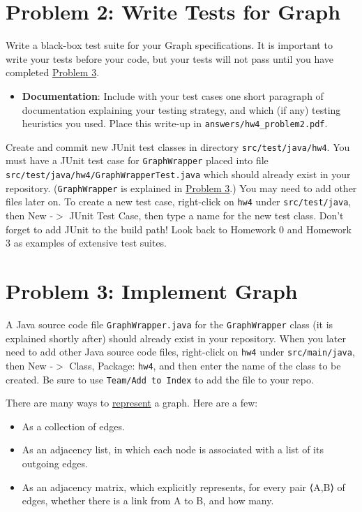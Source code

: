 \documentclass[11pt]{article}
\begin{document}
\newpage

\section*{Problem 2: Write Tests for Graph}
\label{sec:Problem 2}

Write a black-box test suite for your Graph specifications. It is important to write your tests before your code, but your tests will not pass until you have completed \hyperref[sec:Problem 3]{Problem 3}.

\begin{itemize}
\item \textbf{Documentation}: Include with your test cases one short paragraph of documentation explaining your testing strategy, and which (if any) testing heuristics you used. Place this write-up in \texttt{answers/hw4\_problem2.pdf}.
\end{itemize}

\noindent Create and commit new JUnit test classes in directory \texttt{src/test/java/hw4}. You must have a JUnit test case for \texttt{GraphWrapper} placed into file \texttt{src/test/java/hw4/GraphWrapperTest.java} which should already exist in your repository. (\texttt{GraphWrapper} is explained in \hyperref[sec:Problem 3]{Problem 3}.) You may need to add other files later on. To create a new test case, right-click on \texttt{hw4} under \texttt{src/test/java}, then New -$>$ JUnit Test Case, then type a name for the new test class. Don't forget to add JUnit to the build path! Look back to Homework 0 and Homework 3 as examples of extensive test suites.

\section*{Problem 3: Implement Graph}
\label{sec:Problem 3}
A Java source code file \texttt{GraphWrapper.java} for the \texttt{GraphWrapper} class (it is explained shortly after) should already exist in your repository. When you later need to add other Java source code files, right-click on \texttt{hw4} under \texttt{src/main/java}, then New -$>$ Class, Package: \texttt{hw4}, and then enter the name of the class to be created. Be sure to use \texttt{Team/Add to Index} to add the file to your repo.

\noindent There are many ways to \href{http://en.wikipedia.org/wiki/Graph_%28data_structure%29#Representations}{represent} a graph. Here are a few:
\begin{itemize}
\item As a collection of edges.
\item As an adjacency list, in which each node is associated with a list of its outgoing edges.
\item As an adjacency matrix, which explicitly represents, for every pair ⟨A,B⟩ of edges, whether there is a link from A to B, and how many.
\end{itemize}
\end{document}
